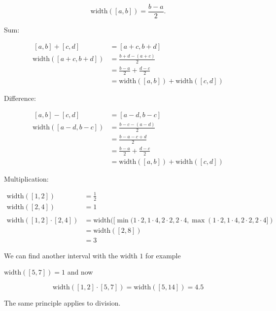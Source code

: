 \documentclass{article}
\newcommand \w[0]{\text{width}}
\begin{document}
\[
   \w([a, b]) = \frac{b - a}{2}.
\]

Sum:

\[
\begin{aligned}
  \, [a, b] + [c, d] & = [a + c, b + d] \\
   \w([a + c, b + d]) &= \frac{b + d - (a + c)}{2} \\
      & = \frac{b - a}{2} + \frac{d - c}{2} \\
      & = \w([a, b]) + \w([c, d])
\end{aligned}
\]

Difference:

\[
\begin{aligned}
   \, [a, b] - [c, d] & = [a - d, b - c] \\
   \w([a - d, b - c]) &= \frac{b - c - (a - d)}{2} \\
      & = \frac{b - a -  c + d}{2} \\
      & = \frac{b - a}{2} + \frac{d - c}{2} \\
      & = \w([a,b]) + \w([c, d])
\end{aligned}
\]

Multiplication:

\[
   \begin{aligned}
      \w([1, 2]) & = \frac{1}{2} \\
      \w([2, 4]) & = 1 \\
      \\
      \w([1, 2] \cdot [2, 4]) & = \w( 
         [\min(1 \cdot 2, 1 \cdot 4, 2 \cdot 2, 2 \cdot 4,
          \max(1 \cdot 2, 1 \cdot 4, 2 \cdot 2, 2 \cdot 4
         ]
      ) \\
      & = \w([2, 8]) \\
      & = 3
   \end{aligned}
\]

We can find another interval with the width $1$ for example

$\w([5, 7]) = 1$ and now 

\[
   \w([1, 2] \cdot [5, 7]) = \w([5, 14]) = 4.5
\]

The same principle applies to division.
\end{document}
